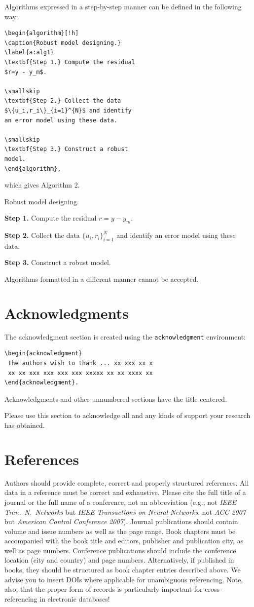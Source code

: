 \documentclass{amcs}
\begin{document}
Algorithms expressed in a step-by-step manner can be defined in the following way:
\begin{verbatim}
\begin{algorithm}[!h]
\caption{Robust model designing.}
\label{a:alg1}
\textbf{Step 1.} Compute the residual
$r=y - y_m$.

\smallskip
\textbf{Step 2.} Collect the data
$\{u_i,r_i\}_{i=1}^{N}$ and identify
an error model using these data.

\smallskip
\textbf{Step 3.} Construct a robust
model.
\end{algorithm},
\end{verbatim}
which gives Algorithm 2.
\begin{algorithm}[!h]
\caption{Robust model designing.}
\label{a:alg1}
\textbf{Step 1.} Compute the residual $r=y - y_m$.

\smallskip
\textbf{Step 2.} Collect the data $\{u_i,r_i\}_{i=1}^{N}$ and identify an error model using these data.

\smallskip
\textbf{Step 3.} Construct a robust model.
\end{algorithm}

Algorithms formatted in a different manner cannot be accepted.

\section{Acknowledgments}
The acknowledgment section is created using the \verb+acknowledgment+ environment:
{\small \begin{verbatim}
\begin{acknowledgment}
 The authors wish to thank ... xx xxx xx x
 xx xx xxx xxx xxx xxx xxxxx xx xx xxxx xx
\end{acknowledgment}.
\end{verbatim}}
Acknowledgments and other unnumbered sections have the title centered.

Please use this section to acknowledge all and any kinds of support your research has obtained.

\section{References}
Authors should provide complete, correct and properly structured references. All data in a reference must be correct and exhaustive. Please cite the full title of a journal or the full name of a conference, not an abbreviation (e.g., not \emph{IEEE Tran.~N.~Networks} but \emph{IEEE Transactions on Neural Networks}, not \emph{ACC 2007} but \emph{American Control Conference 2007}). Journal publications should contain volume and issue numbers as well as the page range. Book chapters must be accompanied with the book title and editors, publisher and publication city, as well as page numbers. Conference publications should include the conference location (city and country) and page numbers. Alternatively, if published in books, they should be structured as book chapter entries described above. We advise you to insert DOIs where applicable for unambiguous referencing. Note, also, that the proper form of records is particularly important for cross-referencing in electronic databases!
\end{document}
